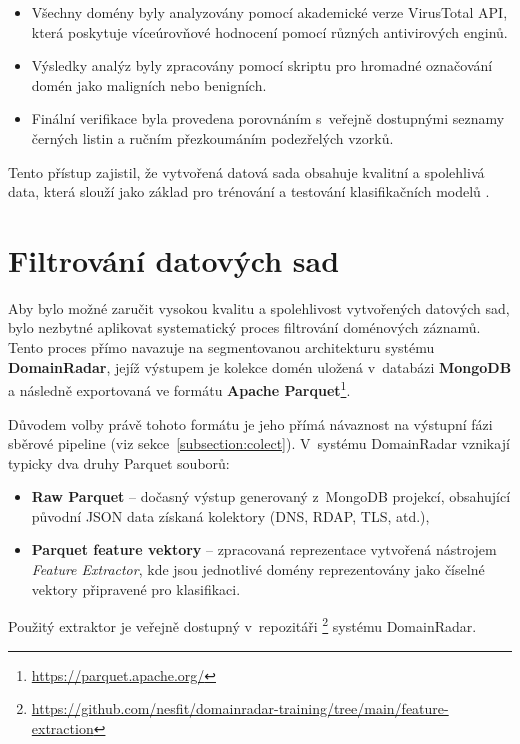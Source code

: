 \begin{itemize}
    \item Všechny domény byly analyzovány pomocí akademické verze VirusTotal API, která poskytuje víceúrovňové hodnocení pomocí různých antivirových enginů.
    \item Výsledky analýz byly zpracovány pomocí skriptu pro hromadné označování domén jako maligních nebo benigních.
    \item Finální verifikace byla provedena porovnáním s~veřejně dostupnými seznamy černých listin a ručním přezkoumáním podezřelých vzorků.
\end{itemize}
Tento přístup zajistil, že vytvořená datová sada obsahuje kvalitní a spolehlivá data, která slouží jako základ pro trénování a testování klasifikačních modelů \cite{petr}.


\section{Filtrování datových sad}
\label{filtering}

Aby bylo možné zaručit vysokou kvalitu a spolehlivost vytvořených datových sad, bylo nezbytné aplikovat systematický proces filtrování doménových záznamů. Tento proces přímo navazuje na segmentovanou architekturu systému \textbf{DomainRadar}, jejíž výstupem je kolekce domén uložená v~databázi \textbf{MongoDB} a následně exportovaná ve formátu \textbf{Apache Parquet}\footnote{\url{https://parquet.apache.org/}}.

Důvodem volby právě tohoto formátu je jeho přímá návaznost na výstupní fázi sběrové pipeline (viz sekce~\ref{subsection:colect}). V~systému DomainRadar vznikají typicky dva druhy Parquet souborů:

\begin{itemize}
    \item \textbf{Raw Parquet} – dočasný výstup generovaný z~MongoDB projekcí, obsahující původní JSON data získaná kolektory (DNS, RDAP, TLS, atd.),
    \item \textbf{Parquet feature vektory} – zpracovaná reprezentace vytvořená nástrojem \textit{Feature Extractor}, kde jsou jednotlivé domény reprezentovány jako číselné vektory připravené pro klasifikaci.
\end{itemize}

Použitý extraktor je veřejně dostupný v~repozitáři \footnote{\url{https://github.com/nesfit/domainradar-training/tree/main/feature-extraction}} systému DomainRadar.

